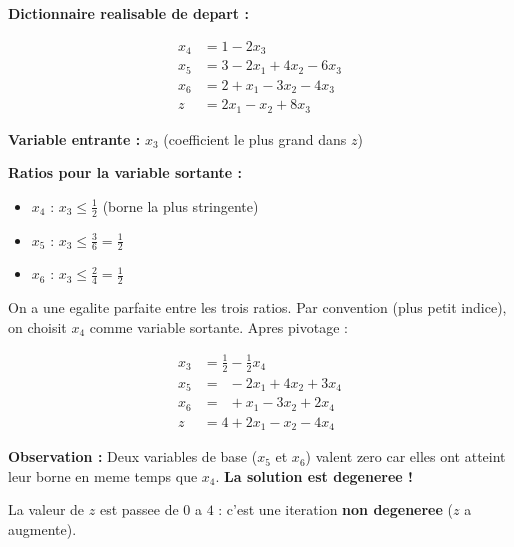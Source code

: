 \documentclass[12pt,a4paper]{article}
\begin{document}
\begin{exemple}
\textbf{Dictionnaire realisable de depart :}

\begin{align*}
x_4 &= 1 - 2x_3\\
x_5 &= 3 - 2x_1 + 4x_2 - 6x_3\\
x_6 &= 2 + x_1 - 3x_2 - 4x_3\\
z &= 2x_1 - x_2 + 8x_3
\end{align*}

\textbf{Variable entrante :} $x_3$ (coefficient le plus grand dans $z$)

\textbf{Ratios pour la variable sortante :}
\begin{itemize}
    \item $x_4$ : $x_3 \leq \frac{1}{2}$ \quad \textcolor{defvert}{(borne la plus stringente)}
    \item $x_5$ : $x_3 \leq \frac{3}{6} = \frac{1}{2}$
    \item $x_6$ : $x_3 \leq \frac{2}{4} = \frac{1}{2}$ \quad 
\end{itemize}

On a une egalite parfaite entre les trois ratios. Par convention (plus petit indice), on choisit $x_4$ comme variable sortante. Apres pivotage :

\begin{align*}
x_3 &= \frac{1}{2} - \frac{1}{2}x_4\\
x_5 &= \phantom{0} - 2x_1 + 4x_2 + 3x_4\\
x_6 &= \phantom{0} + x_1 - 3x_2 + 2x_4\\
z &= 4 + 2x_1 - x_2 - 4x_4
\end{align*}

\textbf{Observation :} Deux variables de base ($x_5$ et $x_6$) valent zero car elles ont atteint leur borne en meme temps que $x_4$. \textcolor{importantrouge}{\textbf{La solution est degeneree !}}

La valeur de $z$ est passee de $0$ a $4$ : c'est une iteration \textcolor{defvert}{\textbf{non degeneree}} ($z$ a augmente).
\end{exemple}
\end{document}

